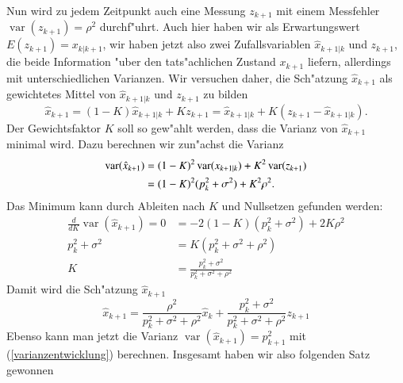 Nun wird zu jedem Zeitpunkt auch eine Messung $z_{k+1}$ mit einem Messfehler
$\operatorname{var}(z_{k+1})=\rho^2$ durchf"uhrt. Auch hier haben wir als
Erwartungswert $E(z_{k+1})=x_{k|k+1}$, wir haben jetzt also zwei Zufallsvariablen
$\hat x_{k+1|k}$ und $z_{k+1}$, die beide Information "uber den tats"achlichen
Zustand $x_{k+1}$ liefern, allerdings mit unterschiedlichen Varianzen. Wir
versuchen daher, die Sch"atzung $\hat x_{k+1}$ als gewichtetes Mittel 
von $\hat x_{k+1|k}$ und $z_{k+1}$ zu bilden
\begin{equation}
\hat x_{k+1}=(1-K)\hat x_{k+1|k}+Kz_{k+1}=\hat x_{k+1|k}+K( z_{k+1} - \hat x_{k+1|k}).
\label{1dimentwicklung}
\end{equation}
Der Gewichtsfaktor $K$ soll so gew"ahlt werden, dass die Varianz von $\hat x_{k+1}$
minimal wird. Dazu berechnen wir zun"achst die Varianz
\begin{align}
\operatorname{var}(\hat x_{k+1})
&=
(1-K)^2\operatorname{var}(x_{k+1|k})+K^2\operatorname{var}(z_{k+1})\notag\\
&=(1-K)^2(p_k^2+\sigma^2)+K^2\rho^2.\label{varianzentwicklung}
\end{align}
Das Minimum kann durch Ableiten nach $K$ und Nullsetzen gefunden werden:
\begin{align*}
\frac{d}{dK}\operatorname{var}(\hat x_{k+1})
=0&=
-2(1-K)(p_k^2+\sigma^2)+2K\rho^2\\
p_k^2+\sigma^2&=K(p_k^2+\sigma^2+\rho^2)\\
K&=\frac{p_k^2+\sigma^2}{p_k^2+\sigma^2+\rho^2}
\end{align*}
Damit wird die Sch"atzung $\hat x_{k+1}$
\[
\hat x_{k+1}=\frac{\rho^2}{p_k^2+\sigma^2+\rho^2}\hat x_k+\frac{p_k^2+\sigma^2}{p_k^2+\sigma^2+\rho^2}z_{k+1}
\]
Ebenso kann man jetzt die Varianz $\operatorname{var}(\hat x_{k+1})=p_{k+1}^2$
mit (\ref{varianzentwicklung}) berechnen. Insgesamt haben wir also folgenden
Satz gewonnen

